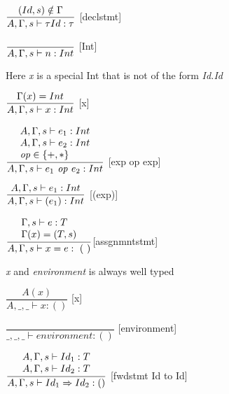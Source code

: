 
\hspace*{10em}
$ \dfrac{(Id, s)\notin \Gamma}{A, \Gamma, s \vdash{} \tau Id : \tau}$ [declstmt]\bigskip

\hspace*{10em}
$ \dfrac{\phantom{}} {A, \Gamma, s \vdash{} n: Int}$ [Int]\bigskip

Here \textit{x} is a special Int that is not of the form
\textit{Id.Id}\bigskip

\hspace*{10em}
$ \dfrac{\Gamma(x)=Int}{A, \Gamma, s \vdash{} x: Int}$ [x]\bigskip

\hspace*{10em}
$\dfrac{
\begin{array}{l}
    A, \Gamma, s \vdash{} e_1 : Int\\
    A, \Gamma, s \vdash{} e_2 : Int\\
    \text{\textit{op}} \in \{+,*\}
\end{array}}
{A, \Gamma, s \vdash{} e_1 \text{\textit{ op }} e_2: Int}$
[exp op exp]\bigskip


\hspace*{10em}
$ \dfrac{A, \Gamma, s \vdash{}e_1:Int}{A, \Gamma, s \vdash{} (e_1): Int}$ [(exp)]\bigskip


\hspace*{10em}
$ \dfrac{
\begin{array}{l}
    \Gamma, s \vdash e : T\\
    \Gamma (x) = (T,s)
\end{array}}
{A, \Gamma, s \vdash{} x=e:~(~)} $[assgnmntstmt]\bigskip

\textit{x} and \textit{environment} is always well typed\bigskip

\hspace*{10em}
$ \dfrac{A(x)}{A,\_,\_ \vdash x:()}$ [x]\bigskip

\hspace*{10em}
$ \dfrac{\phantom{}}{\_,\_,\_ \vdash environment: ()}$ [environment]\bigskip

\hspace*{10em}
$ \dfrac{
\begin{array}{l}
    A, \Gamma, s \vdash{} Id_1 : T\\
    A, \Gamma, s \vdash{} Id_2 : T\\
\end{array}
}{A, \Gamma, s \vdash{} Id_1 \Rightarrow Id_2 : ()}$ [fwdstmt Id to Id]\bigskip

